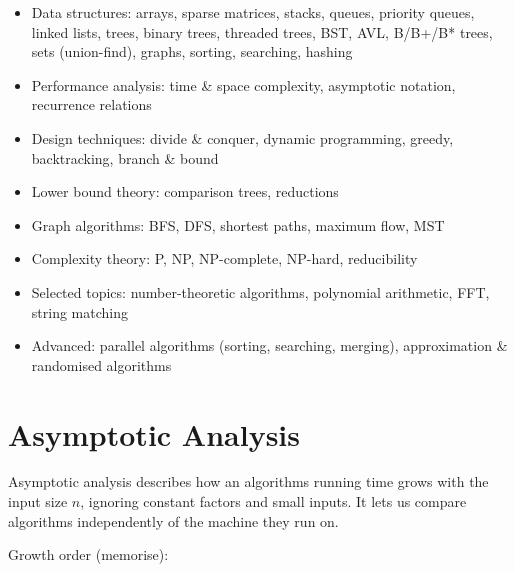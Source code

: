 

\begin{sylbox}

\begin{itemize}
\tightlist
\item[$\square$]
  Data structures: arrays, sparse matrices, stacks, queues, priority queues, linked lists, trees, binary trees, threaded trees, BST, AVL, B/B+/B* trees, sets (union-find), graphs, sorting, searching, hashing
\item[$\square$]
  Performance analysis: time \& space complexity, asymptotic notation, recurrence relations
\item[$\square$]
  Design techniques: divide \& conquer, dynamic programming, greedy, backtracking, branch \& bound
\item[$\square$]
  Lower bound theory: comparison trees, reductions
\item[$\square$]
  Graph algorithms: BFS, DFS, shortest paths, maximum flow, MST
\item[$\square$]
  Complexity theory: P, NP, NP-complete, NP-hard, reducibility
\item[$\square$]
  Selected topics: number-theoretic algorithms, polynomial arithmetic, FFT, string matching
\item[$\square$]
  Advanced: parallel algorithms (sorting, searching, merging), approximation \& randomised algorithms
\end{itemize}

\end{sylbox}

\needspace{125pt}

\hypertarget{p2-07--1-asymptotic-analysis}{%
\section{Asymptotic Analysis}\label{p2-07--1-asymptotic-analysis}}

Asymptotic analysis describes how an algorithm\textquotesingle s running time grows with the input size \(n\), ignoring constant
factors and small inputs. It lets us compare algorithms independently of the machine they run on.



Growth order (memorise):

